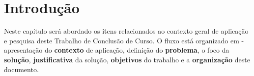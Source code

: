 \chapter{Introdução}
\label{chap:intro}

Neste capítulo será abordado os itens relacionados ao contexto geral de
aplicação e pesquisa deste Trabalho de Conclusão de Curso. O fluxo está
organizado em - apresentação do \textbf{contexto} de aplicação, definição do
\textbf{problema}, o foco da \textbf{solução}, \textbf{justificativa} da solução, \textbf{objetivos}
do trabalho e a \textbf{organização} deste documento.




